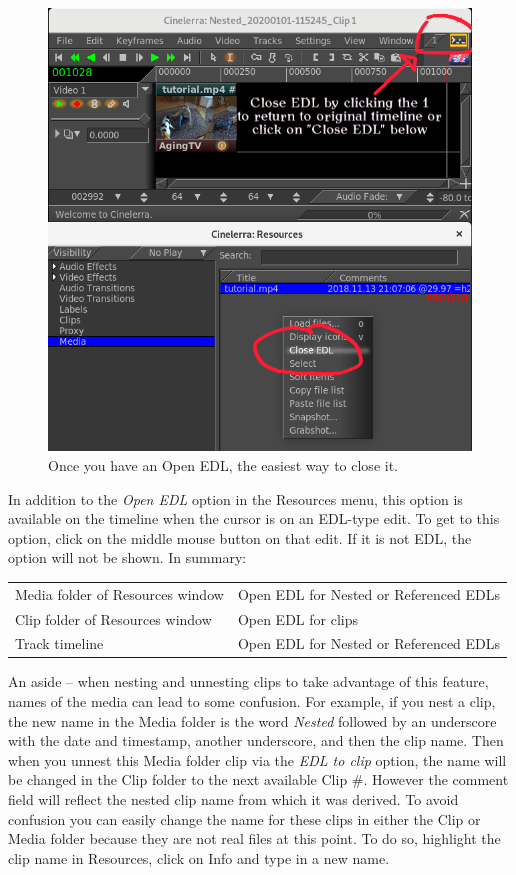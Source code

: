 \begin{figure}[h]
  \centering
  \includegraphics[width=1\linewidth]{editing-img001.png}
  \caption{Once you have an Open EDL, the easiest way to close it.}
  \label{fig:open_edl}
\end{figure}
\relax

In addition to the \textit{Open EDL} option in the Resources menu,
this option is available on the timeline when the cursor is on an
EDL-type edit. To get to this option, click on the middle mouse
button on that edit.  If it is not EDL, the option will not be
shown.  In summary:

\begin{center}
  \begin{tabular}{ll}
    \toprule
    Media folder of Resources window & Open EDL for Nested or Referenced EDLs\\
    Clip folder of Resources window & Open EDL for clips\\
    Track timeline & Open EDL for Nested or Referenced EDLs\\
    \bottomrule
  \end{tabular}
\end{center}

An aside -- when nesting and unnesting clips to take advantage of
this feature, names of the media can lead to some confusion.  For
example, if you nest a clip, the new name in the Media folder is the
word \textit{Nested} followed by an underscore with the date and
timestamp, another underscore, and then the clip name.  Then when
you unnest this Media folder clip via the \textit{EDL to clip}
option, the name will be changed in the Clip folder to the next
available Clip \#.  However the comment field will reflect the
nested clip name from which it was derived.  To avoid confusion you
can easily change the name for these clips in either the Clip or
Media folder because they are not real files at this point. To do
so, highlight the clip name in Resources, click on Info and type in
a new name.

